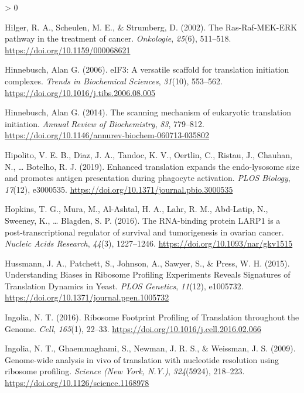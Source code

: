 \documentclass[
  12pt,
  openany]{book}
\newlength{\cslhangindent}
\newenvironment{CSLReferences}[2] %
 {%
  \setlength{\parindent}{0pt}
  \ifodd #1 \everypar{\setlength{\hangindent}{\cslhangindent}}\ignorespaces\fi
  \ifnum #2 > 0
  \setlength{\parskip}{#2\baselineskip}
  \fi
 }%
 {}
\begin{document}
\begin{CSLReferences}{1}{0}
\leavevmode\hypertarget{ref-Hilger2002}{}%
Hilger, R. A., Scheulen, M. E., \& Strumberg, D. (2002). The {Ras}-{Raf}-{MEK}-{ERK} pathway in the treatment of cancer. \emph{Onkologie}, \emph{25}(6), 511--518. \url{https://doi.org/10.1159/000068621}

\leavevmode\hypertarget{ref-Hinnebusch2006}{}%
Hinnebusch, Alan G. (2006). {eIF3}: A versatile scaffold for translation initiation complexes. \emph{Trends in Biochemical Sciences}, \emph{31}(10), 553--562. \url{https://doi.org/10.1016/j.tibs.2006.08.005}

\leavevmode\hypertarget{ref-Hinnebusch2014}{}%
Hinnebusch, Alan G. (2014). The scanning mechanism of eukaryotic translation initiation. \emph{Annual Review of Biochemistry}, \emph{83}, 779--812. \url{https://doi.org/10.1146/annurev-biochem-060713-035802}

\leavevmode\hypertarget{ref-Hipolito2019}{}%
Hipolito, V. E. B., Diaz, J. A., Tandoc, K. V., Oertlin, C., Ristau, J., Chauhan, N., \ldots{} Botelho, R. J. (2019). Enhanced translation expands the endo-lysosome size and promotes antigen presentation during phagocyte activation. \emph{PLOS Biology}, \emph{17}(12), e3000535. \url{https://doi.org/10.1371/journal.pbio.3000535}

\leavevmode\hypertarget{ref-Hopkins2016}{}%
Hopkins, T. G., Mura, M., Al-Ashtal, H. A., Lahr, R. M., Abd-Latip, N., Sweeney, K., \ldots{} Blagden, S. P. (2016). The {RNA}-binding protein {LARP1} is a post-transcriptional regulator of survival and tumorigenesis in ovarian cancer. \emph{Nucleic Acids Research}, \emph{44}(3), 1227--1246. \url{https://doi.org/10.1093/nar/gkv1515}

\leavevmode\hypertarget{ref-Hussmann2015}{}%
Hussmann, J. A., Patchett, S., Johnson, A., Sawyer, S., \& Press, W. H. (2015). Understanding {Biases} in {Ribosome Profiling Experiments Reveals Signatures} of {Translation Dynamics} in {Yeast}. \emph{PLOS Genetics}, \emph{11}(12), e1005732. \url{https://doi.org/10.1371/journal.pgen.1005732}

\leavevmode\hypertarget{ref-Ingolia2016}{}%
Ingolia, N. T. (2016). Ribosome {Footprint Profiling} of {Translation} throughout the {Genome}. \emph{Cell}, \emph{165}(1), 22--33. \url{https://doi.org/10.1016/j.cell.2016.02.066}

\leavevmode\hypertarget{ref-Ingolia2009}{}%
Ingolia, N. T., Ghaemmaghami, S., Newman, J. R. S., \& Weissman, J. S. (2009). Genome-wide analysis in vivo of translation with nucleotide resolution using ribosome profiling. \emph{Science (New York, N.Y.)}, \emph{324}(5924), 218--223. \url{https://doi.org/10.1126/science.1168978}


\end{CSLReferences}
\end{document}

